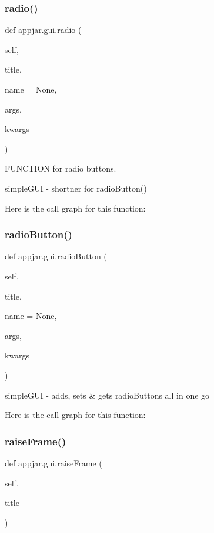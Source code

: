 \begin{DoxyVerb}
\subsubsection{\texorpdfstring{radio()}{radio()}}
{\footnotesize\ttfamily def appjar.\+gui.\+radio (\begin{DoxyParamCaption}\item[{}]{self,  }\item[{}]{title,  }\item[{}]{name = {\ttfamily None},  }\item[{}]{args,  }\item[{}]{kwargs }\end{DoxyParamCaption})}



F\+U\+N\+C\+T\+I\+ON for radio buttons. 

\begin{DoxyVerb}simpleGUI - shortner for radioButton() \end{DoxyVerb}
 Here is the call graph for this function\+:
\mbox{\label{classappjar_1_1gui_a124d04efc7d2e554655f0f1a8c7f4177}} 
\subsubsection{\texorpdfstring{radio\+Button()}{radioButton()}}
{\footnotesize\ttfamily def appjar.\+gui.\+radio\+Button (\begin{DoxyParamCaption}\item[{}]{self,  }\item[{}]{title,  }\item[{}]{name = {\ttfamily None},  }\item[{}]{args,  }\item[{}]{kwargs }\end{DoxyParamCaption})}

\begin{DoxyVerb}simpleGUI - adds, sets & gets radioButtons all in one go \end{DoxyVerb}
 Here is the call graph for this function\+:
\mbox{\label{classappjar_1_1gui_a887e02904802ffaec260acbb8b8b894a}} 
\subsubsection{\texorpdfstring{raise\+Frame()}{raiseFrame()}}
{\footnotesize\ttfamily def appjar.\+gui.\+raise\+Frame (\begin{DoxyParamCaption}\item[{}]{self,  }\item[{}]{title }\end{DoxyParamCaption})}


\end{DoxyVerb}
